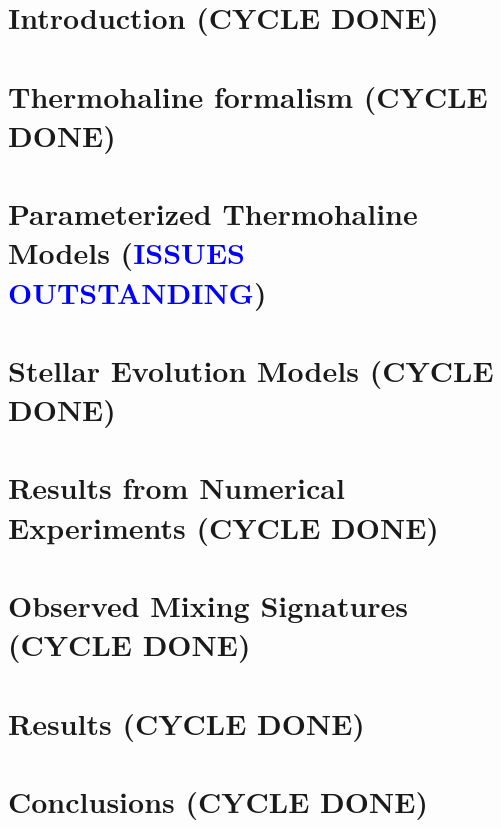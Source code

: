 \documentclass[linenumbers,twocolumn]{aastex62}
\newcommand{\blu}{\textcolor{blue} }
\begin{document}

\section{Introduction \textbf{(CYCLE DONE)} } 
\label{sec:intro}
\setcounter{footnote}{0}


\section{Thermohaline formalism \textbf{(CYCLE DONE)} }
\label{sec:formalism}


\section{Parameterized Thermohaline Models \textbf{(\blu{ISSUES OUTSTANDING})}}
\label{sec:parameterizations}


\section{Stellar Evolution Models \textbf{(CYCLE DONE)}} %
\label{sec:mesa_experiment}


\section{Results from Numerical Experiments \textbf{(CYCLE DONE)} }
\label{sec:mesa_results}


\section{Observed Mixing Signatures \textbf{(CYCLE DONE)} }
\label{sec:obs}


\section{Results \textbf{(CYCLE DONE)} } 
\label{sec:punchline}


\section{Conclusions \textbf{(CYCLE DONE)} }
\label{sec:conclusions}

\end{document}
